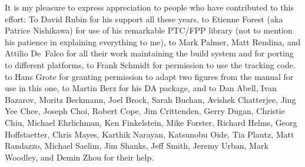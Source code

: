 It is my pleasure to express appreciation to people who have
contributed to this effort: To David Rubin for his support all these
years, to Etienne Forest (aka Patrice Nishikawa) for use of his
remarkable PTC/FPP library (not to mention his patience in explaining
everything to me), to Mark Palmer, Matt Rendina, and Attilio De~Falco
for all their work maintaining the build system and for porting \bmad
to different platforms, to Frank Schmidt for permission to use the
\mad tracking code. to Hans Grote for granting permission to adapt two
figures from the \mad manual for use in this one, to Martin Berz for
his DA package, and to Dan Abell, Ivan Bazarov, Moritz Beckmann, Joel
Brock, Sarah Buchan, Avishek Chatterjee, Jing Yee Chee, Joseph Choi,
Robert Cope, Jim Crittenden, Gerry Dugan, Christie Chiu, Michael
Ehrlichman, Ken Finkelstein, Mike Forster, Richard Helms, Georg
Hoffstaetter, Chris Mayes, Karthik Narayan, Katsunobu Oide, Tia
Plautz, Matt Randazzo, Michael Saelim, Jim Shanks, Jeff Smith, Jeremy
Urban, Mark Woodley, and Demin Zhou for their help.

